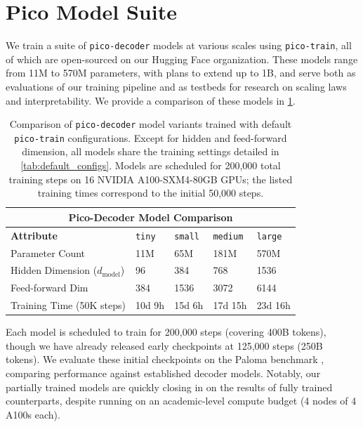 \section{Pico Model Suite}

We train a suite of \texttt{pico-decoder} models at various scales using \texttt{pico-train}, all of which are open-sourced on our Hugging Face organization. These models range from 11M to 570M parameters, with plans to extend up to 1B, and serve both as evaluations of our training pipeline and as testbeds for research on scaling laws and interpretability. We provide a comparison of these models in \cref{tab:pico-decoder-configs}.

\begin{table}[h!]
    \centering
    \renewcommand{\arraystretch}{1.2}
    \begin{tabular}{|p{}||p{}|p{}|p{}|p{}|}
    \hline
    \multicolumn{5}{|c|}{\textbf{Pico-Decoder Model Comparison}} \\
    \hline
    \textbf{Attribute} & \texttt{tiny} & \texttt{small} & \texttt{medium} & \texttt{large} \\
    \hline
    Parameter Count & 11M & 65M & 181M & 570M \\
    Hidden Dimension ($d_{\text{model}}$) & 96 & 384 & 768 & 1536 \\
    Feed-forward Dim & 384 & 1536 & 3072 & 6144 \\
    Training Time (50K steps) & 10d 9h & 15d 6h & 17d 15h & 23d 16h \\
    \hline
    \end{tabular}
    \vspace{0.5em}
    \caption{Comparison of \texttt{pico-decoder} model variants trained with default \texttt{pico-train} configurations. Except for hidden and feed-forward dimension, all models share the training settings detailed in \cref{tab:default_configs}. Models are scheduled for 200,000 total training steps on 16 NVIDIA A100-SXM4-80GB GPUs; the listed training times correspond to the initial 50,000 steps.}
    \label{tab:pico-decoder-configs}
    \end{table}

Each model is scheduled to train for 200,000 steps (covering 400B tokens), though we have already released early checkpoints at 125,000 steps (250B tokens). We evaluate these initial checkpoints on the Paloma benchmark \citep{magnusson2024paloma}, comparing performance against established decoder models. Notably, our partially trained models are quickly closing in on the results of fully trained counterparts, despite running on an academic-level compute budget (4 nodes of 4 A100s each).


